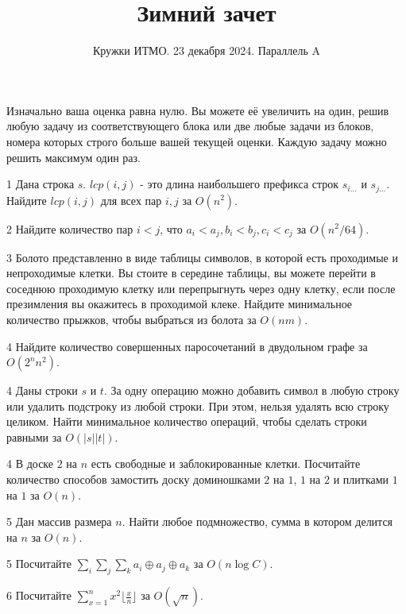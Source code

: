 \documentclass{article}
\title{Зимний зачет}
\author{Кружки ИТМО. 23 декабря 2024. Параллель A}
\date{}
\begin{document}
	
	\maketitle
	
	Изначально ваша оценка равна нулю. Вы можете её увеличить на один, решив любую задачу из соответствующего блока или две любые задачи из блоков, номера которых строго больше вашей текущей оценки. Каждую задачу можно решить максимум один раз.
	
	
	\begin{tasks}

		\item[1] Дана строка $s$. $lcp(i, j)$ - это длина наибольшего префикса строк $s_{i...}$ и $s_{j...}$. Найдите $lcp(i, j)$ для всех пар $i, j$ за $O(n^2)$.

		\item[2] Найдите количество пар $i < j$, что $a_i < a_j, b_i < b_j, c_i < c_j$ за $O(n^2/64)$.
		
		\item[3] Болото представленно в виде таблицы символов, в которой есть проходимые и непроходимые клетки. Вы стоите в середине таблицы, вы можете перейти в соседнюю проходимую клетку или перепрыгнуть через одну клетку, если после презимления вы окажитесь в проходимой клеке. Найдите минимальное количество прыжков, чтобы выбраться из болота за $O(nm)$.
		
		\item[4] Найдите количество совершенных паросочетаний в двудольном графе за $O(2^n n^2)$.

		\item[4] Даны строки $s$ и $t$. За одну операцию можно добавить символ в любую строку или удалить подстроку из любой строки. При этом, нельзя удалять всю строку целиком. Найти минимальное количество операций, чтобы сделать строки равными за $O(|s| |t|)$.
		
		
		\item[4] В доске $2$ на $n$ есть свободные и заблокированные клетки. Посчитайте количество способов замостить доску доминошками $2$ на $1$, $1$ на $2$ и плитками $1$ на $1$ за $O(n)$.
		
		
		\item[5] Дан массив размера $n$. Найти любое подмножество, сумма в котором делится на $n$ за $O(n)$.

		\item[5] Посчитайте $\sum_i \sum_j \sum_k a_i \oplus a_j \oplus a_k$ за $O(n \log C)$.

		\item[6] Посчитайте $\sum_{x = 1}^{n} x^2 \lfloor \frac{x}{n} \rfloor$ за $O(\sqrt n)$.


\end{tasks}
\end{document}
